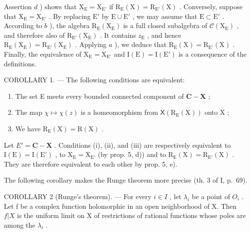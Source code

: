 Assertion \(d\) ) shows that \(\mathrm{X}_{\mathrm{E}} = \mathrm{X}_{\mathrm{E}'}\) if \(\mathrm{R}_{\mathrm{E}}(\mathrm{X}) = \mathrm{R}_{\mathrm{E}'}(\mathrm{X})\) . Conversely, suppose that \(\mathrm{X}_{\mathrm{E}} = \mathrm{X}_{\mathrm{E}'}\) . By replacing \(\mathrm{E}'\) by \(\mathrm{E} \cup \mathrm{E}'\) , we may assume that \(\mathrm{E} \subset \mathrm{E}'\) . According to \(b\) ), the algebra \(\mathrm{R}_{\mathrm{E}}(\mathrm{X}_{\mathrm{E}})\) is a full closed subalgebra of \(\mathcal{C}(\mathrm{X}_{\mathrm{E}})\) , and therefore also of \(\mathrm{R}_{\mathrm{E}'}(\mathrm{X}_{\mathrm{E}})\) . It contains \(z_{\mathrm{E}}\) , and hence \(\mathrm{R}_{\mathrm{E}}(\mathrm{X}_{\mathrm{E}}) = \mathrm{R}_{\mathrm{E}'}(\mathrm{X}_{\mathrm{E}})\) . Applying \(a\) ), we deduce that \(\mathrm{R}_{\mathrm{E}}(\mathrm{X}) = \mathrm{R}_{\mathrm{E}'}(\mathrm{X})\) . Finally, the equivalence of \(\mathrm{X}_{\mathrm{E}} = \mathrm{X}_{\mathrm{E}'}\) and \(\mathrm{I}(\mathrm{E}) = \mathrm{I}(\mathrm{E}')\) is a consequence of the definitions.

COROLLARY 1. --- The following conditions are equivalent:

\begin{enumerate}
\def\labelenumi{(\roman{enumi})}
\item
  The set E meets every bounded connected component of \(\mathbf{C} - \mathbf{X}\) ;
\item
  The map \(\chi \mapsto \chi (z)\) is a homeomorphism from \(\mathsf{X}(\mathrm{R}_{\mathrm{E}}(\mathrm{X}))\) onto \(\mathrm{X}\) ;
\item
  We have \(\mathrm{R_E(X)} = \mathrm{R(X)}\) .
\end{enumerate}

Let \(E' = \mathbf{C} - \mathbf{X}\) . Conditions (i), (ii), and (iii) are respectively equivalent to \(\mathrm{I}(\mathrm{E}) = \mathrm{I}(\mathrm{E}')\) , to \(\mathrm{X}_{\mathrm{E}} = \mathrm{X}_{\mathrm{E}'}\) (by prop. 5, d)) and to \(\mathrm{R}_{\mathrm{E}}(\mathrm{X}) = \mathrm{R}_{\mathrm{E}'}(\mathrm{X})\) . They are therefore equivalent to each other by prop. 5, e).

The following corollary makes the Runge theorem more precise (th. 3 of I, p.~69).

COROLLARY 2 (Runge's theorem). --- For every \(i \in I\) , let \(\lambda_{i}\) be a point of \(O_{i}\) . Let f be a complex function holomorphic in an open neighborhood of X. Then \(f|X\) is the uniform limit on X of restrictions of rational functions whose poles are among the \(\lambda_{i}\) .

